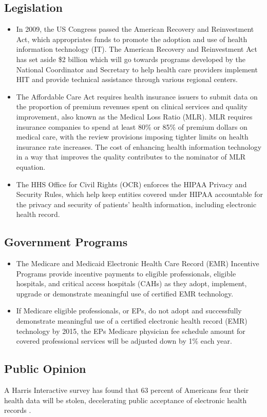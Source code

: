 \subsection{Legislation}
\begin{itemize}
\item In 2009, the US Congress passed the American Recovery and Reinvestment Act, which appropriates funds to promote the adoption and use of health information technology (IT). The American Recovery and Reinvestment Act has set aside \$2 billion which will go towards programs developed by the National Coordinator and Secretary to help health care providers implement HIT and provide technical assistance through various regional centers.
\item The Affordable Care Act requires health insurance issuers to submit data on the proportion of premium revenues spent on clinical services and quality improvement, also known as the Medical Loss Ratio (MLR). MLR requires insurance companies to spend at least 80\% or 85\% of premium dollars on medical care, with the review provisions imposing tighter limits on health insurance rate increases. The cost of enhancing health information technology in a way that improves the quality contributes to the nominator of MLR equation.
\item  The HHS Office for Civil Rights (OCR) enforces the HIPAA Privacy and Security Rules, which help keep entities covered under HIPAA accountable for the privacy and security of patients' health information, including electronic health record.
\end{itemize}

\subsection{Government Programs}
\begin{itemize}
\item The Medicare and Medicaid Electronic Health Care Record (EMR) Incentive Programs provide incentive payments to eligible professionals, eligible hospitals, and critical access hospitals (CAHs) as they adopt, implement, upgrade or demonstrate meaningful use of certified EMR technology.
\item If Medicare eligible professionals, or EPs, do not adopt and successfully demonstrate meaningful use of a certified electronic health record (EMR) technology by 2015, the EPs Medicare physician fee schedule amount for covered professional services will be adjusted down by 1\% each year.
\end{itemize}

\subsection{Public Opinion}
A Harris Interactive survey has found that 63 percent of Americans fear their health data will be stolen, decelerating public acceptance of electronic health records \citep{Kaiser2012}.

